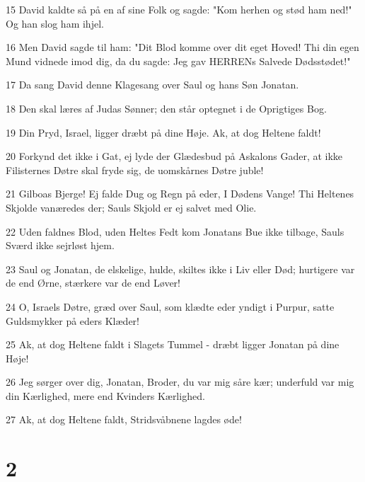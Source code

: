 \par 15 David kaldte så på en af sine Folk og sagde: "Kom herhen og stød ham ned!" Og han slog ham ihjel.
\par 16 Men David sagde til ham: "Dit Blod komme over dit eget Hoved! Thi din egen Mund vidnede imod dig, da du sagde: Jeg gav HERRENs Salvede Dødsstødet!"
\par 17 Da sang David denne Klagesang over Saul og hans Søn Jonatan.
\par 18 Den skal læres af Judas Sønner; den står optegnet i de Oprigtiges Bog.
\par 19 Din Pryd, Israel, ligger dræbt på dine Høje. Ak, at dog Heltene faldt!
\par 20 Forkynd det ikke i Gat, ej lyde der Glædesbud på Askalons Gader, at ikke Filisternes Døtre skal fryde sig, de uomskårnes Døtre juble!
\par 21 Gilboas Bjerge! Ej falde Dug og Regn på eder, I Dødens Vange! Thi Heltenes Skjolde vanæredes der; Sauls Skjold er ej salvet med Olie.
\par 22 Uden faldnes Blod, uden Heltes Fedt kom Jonatans Bue ikke tilbage, Sauls Sværd ikke sejrløst hjem.
\par 23 Saul og Jonatan, de elskelige, hulde, skiltes ikke i Liv eller Død; hurtigere var de end Ørne, stærkere var de end Løver!
\par 24 O, Israels Døtre, græd over Saul, som klædte eder yndigt i Purpur, satte Guldsmykker på eders Klæder!
\par 25 Ak, at dog Heltene faldt i Slagets Tummel - dræbt ligger Jonatan på dine Høje!
\par 26 Jeg sørger over dig, Jonatan, Broder, du var mig såre kær; underfuld var mig din Kærlighed, mere end Kvinders Kærlighed.
\par 27 Ak, at dog Heltene faldt, Stridsvåbnene lagdes øde!

\chapter{2}

